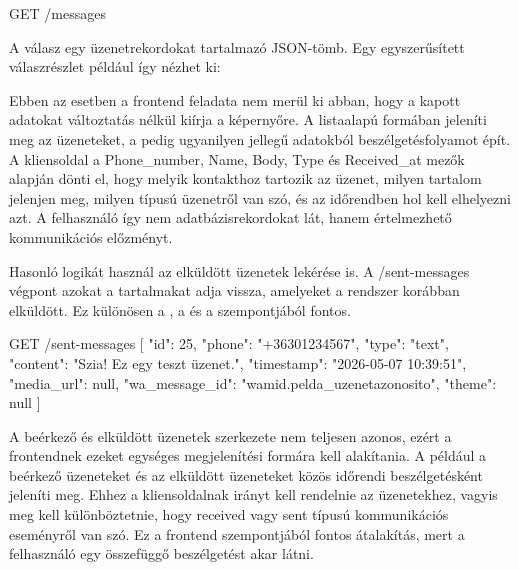 \begin{CodeBlock}
GET /messages
\end{CodeBlock}

A válasz egy üzenetrekordokat tartalmazó JSON-tömb. Egy egyszerűsített válaszrészlet például így nézhet ki:

\begin{CodeBlock}
\end{CodeBlock}

Ebben az esetben a frontend feladata nem merül ki abban, hogy a kapott adatokat változtatás nélkül kiírja a képernyőre. A  listaalapú formában jeleníti meg az üzeneteket, a  pedig ugyanilyen jellegű adatokból beszélgetésfolyamot épít. A kliensoldal a Phone\_number, Name, Body, Type és Received\_at mezők alapján dönti el, hogy melyik kontakthoz tartozik az üzenet, milyen tartalom jelenjen meg, milyen típusú üzenetről van szó, és az időrendben hol kell elhelyezni azt. A felhasználó így nem adatbázisrekordokat lát, hanem értelmezhető kommunikációs előzményt.

Hasonló logikát használ az elküldött üzenetek lekérése is. A /sent-messages végpont azokat a tartalmakat adja vissza, amelyeket a rendszer korábban elküldött. Ez különösen a , a  és a  szempontjából fontos.

\begin{CodeBlock}
GET /sent-messages
[
  {
    "id": 25,
    "phone": "+36301234567",
    "type": "text",
    "content": "Szia! Ez egy teszt üzenet.",
    "timestamp": "2026-05-07 10:39:51",
    "media\_url": null,
    "wa_message\_id": "wamid.pelda_uzenetazonosito",
    "theme": null
  }
]
\end{CodeBlock}

A beérkező és elküldött üzenetek szerkezete nem teljesen azonos, ezért a frontendnek ezeket egységes megjelenítési formára kell alakítania. A  például a beérkező üzeneteket és az elküldött üzeneteket közös időrendi beszélgetésként jeleníti meg. Ehhez a kliensoldalnak irányt kell rendelnie az üzenetekhez, vagyis meg kell különböztetnie, hogy received vagy sent típusú kommunikációs eseményről van szó. Ez a frontend szempontjából fontos átalakítás, mert a felhasználó egy összefüggő beszélgetést akar látni.

